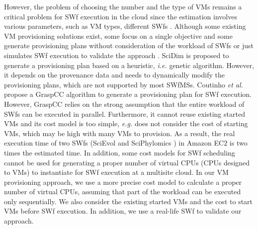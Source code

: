 However, the problem of choosing the number and the type of VMs remains a critical problem for SWf execution in the cloud since the estimation involves various parameters, such as VM types, different SWfs \cite{Coutinho2014}. 
Although some existing VM provisioning solutions exist, some \cite{Emeakaroha13} focus on a single objective and some generate provisioning plans without consideration of the workload of SWfs \cite{Shen11,Coutinho2014} or just simulates SWf execution to validate the approach \cite{Xu12}.
SciDim \cite{Oliveira13} is proposed to generate a provisioning plan based on a heuristic, \textit{i.e.} genetic algorithm. However, it depends on the provenance data and needs to dynamically modify the provisioning plans, which are not supported by most SWfMSs.
Coutinho \textit{et al.} \cite{Coutinho2014} propose a GraspCC algorithm to generate a provisioning plan for SWf execution. However, GraspCC relies on the strong assumption that the entire workload of SWfs can be executed in parallel. Furthermore, it cannot reuse existing started VMs and its cost model is too simple, \textit{e.g.} does not consider the cost of starting VMs, which may be high with many VMs to provision.
As a result, the real execution time of two SWfs (SciEvol and SciPhylomics \cite{Oliveira2013}) in Amazon EC$2$ \cite{AmazonCloud} is two times the estimated time.
In addition, some cost models \cite{Oliveira2012}\cite{Sardina2010} for SWf scheduling cannot be used for generating a proper number of virtual CPUs (CPUs designed to VMs) to instantiate for SWf execution at a multisite cloud.
In our VM provisioning approach, we use a more precise cost model to calculate a proper number of virtual CPUs, assuming that part of the workload can be executed only sequentially. We also consider the existing started VMs and the cost to start VMs before SWf execution. In addition, we use a real-life SWf to validate our approach.

